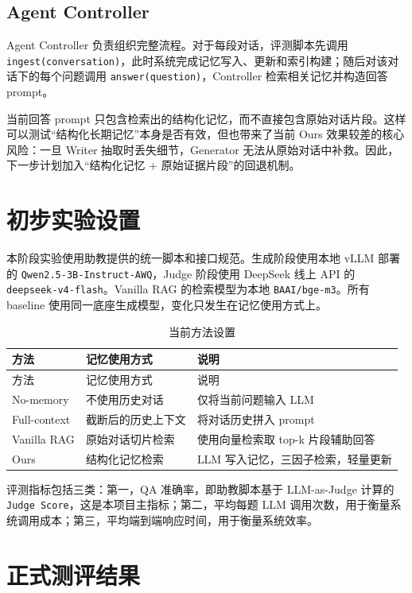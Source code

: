 \documentclass[UTF8,a4paper,11pt]{ctexart}
\begin{document}
\subsection{Agent Controller}

Agent Controller 负责组织完整流程。对于每段对话，评测脚本先调用 \texttt{ingest(conversation)}，此时系统完成记忆写入、更新和索引构建；随后对该对话下的每个问题调用 \texttt{answer(question)}，Controller 检索相关记忆并构造回答 prompt。

当前回答 prompt 只包含检索出的结构化记忆，而不直接包含原始对话片段。这样可以测试“结构化长期记忆”本身是否有效，但也带来了当前 Ours 效果较差的核心风险：一旦 Writer 抽取时丢失细节，Generator 无法从原始对话中补救。因此，下一步计划加入“结构化记忆 + 原始证据片段”的回退机制。

\section{初步实验设置}

本阶段实验使用助教提供的统一脚本和接口规范。生成阶段使用本地 vLLM 部署的 \texttt{Qwen2.5-3B-Instruct-AWQ}，Judge 阶段使用 DeepSeek 线上 API 的 \texttt{deepseek-v4-flash}。Vanilla RAG 的检索模型为本地 \texttt{BAAI/bge-m3}。所有 baseline 使用同一底座生成模型，变化只发生在记忆使用方式上。

\begin{longtable}{L{2.8cm}L{4.2cm}L{6.0cm}}
\caption{当前方法设置}\\
\toprule
方法 & 记忆使用方式 & 说明 \\
\midrule
\endfirsthead
\toprule
方法 & 记忆使用方式 & 说明 \\
\midrule
\endhead
\midrule
\endfoot
\bottomrule
\endlastfoot
No-memory & 不使用历史对话 & 仅将当前问题输入 LLM \\
Full-context & 截断后的历史上下文 & 将对话历史拼入 prompt \\
Vanilla RAG & 原始对话切片检索 & 使用向量检索取 top-k 片段辅助回答 \\
Ours & 结构化记忆检索 & LLM 写入记忆，三因子检索，轻量更新 \\
\end{longtable}

评测指标包括三类：第一，QA 准确率，即助教脚本基于 LLM-as-Judge 计算的 \texttt{Judge Score}，这是本项目主指标；第二，平均每题 LLM 调用次数，用于衡量系统调用成本；第三，平均端到端响应时间，用于衡量系统效率。

\section{正式测评结果}
\end{document}
